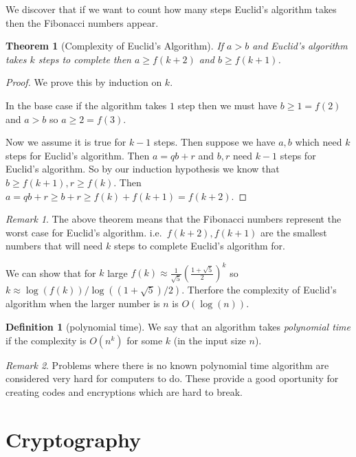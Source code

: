 \documentclass[
]{book}
\newtheorem{theorem}{Theorem}[chapter]
\theoremstyle{definition}
\newtheorem{definition}{Definition}[chapter]
\theoremstyle{definition}
\theoremstyle{definition}
\theoremstyle{definition}
\theoremstyle{remark}
\newtheorem*{remark}{Remark}
\begin{document}
We discover that if we want to count how many steps Euclid's algorithm takes then the Fibonacci numbers appear.

\begin{theorem}[Complexity of Euclid's Algorithm]
If \(a>b\) and Euclid's algorithm takes \(k\) steps to complete then \(a \geq f(k+2)\) and \(b \geq f(k+1)\).
\end{theorem}

\begin{proof}
We prove this by induction on \(k\).

In the base case if the algorithm takes \(1\) step then we must have \(b\geq 1=f(2)\) and \(a>b\) so \(a \geq 2 = f(3)\).

Now we assume it is true for \(k-1\) steps. Then suppose we have \(a,b\) which need \(k\) steps for Euclid's algorithm. Then \(a=qb +r\) and \(b,r\) need \(k-1\) steps for Euclid's algorithm. So by our induction hypothesis we know that \(b\geq f(k+1), r \geq f(k)\). Then \(a = qb +r \geq b +r \geq f(k) + f(k+1) = f(k+2)\).
\end{proof}

\begin{remark}
The above theorem means that the Fibonacci numbers represent the worst case for Euclid's algorithm. i.e.~\(f(k+2), f(k+1)\) are the smallest numbers that will need \(k\) steps to complete Euclid's algorithm for.

We can show that for \(k\) large \(f(k) \approx \frac{1}{\sqrt{5}} \left(\frac{1+\sqrt{5}}{2}\right)^k\) so \(k \approx \log(f(k))/\log((1+\sqrt{5})/2)\). Therfore the complexity of Euclid's algorithm when the larger number is \(n\) is \(O(\log(n))\).
\end{remark}

\begin{definition}[polynomial time]
We say that an algorithm takes \emph{polynomial time} if the complexity is \(O(n^k)\) for some \(k\) (in the input size \(n\)).
\end{definition}

\begin{remark}
Problems where there is no known polynomial time algorithm are considered very hard for computers to do. These provide a good oportunity for creating codes and encryptions which are hard to break.
\end{remark}

\chapter{Cryptography}\label{cryptography}
\end{document}
